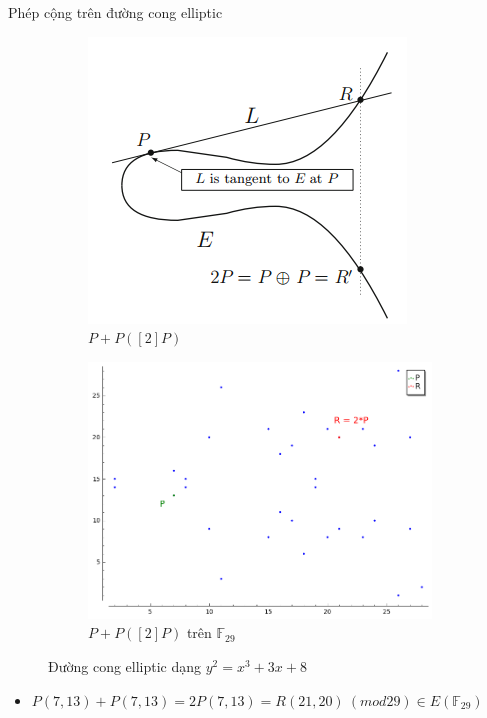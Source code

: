 \documentclass[compress]{beamer}
\begin{document}
\begin{frame}{Phép cộng trên đường cong elliptic}
\begin{figure}[h]
\begin{subfigure}{.5\textwidth}
  \centering
  \includegraphics[width=0.85\linewidth]{../im3.png}
  \caption{$P + P ([2]P)$}
  \label{fig:sfig1}
\end{subfigure}%
\begin{subfigure}{.5\textwidth}
  \centering
  \includegraphics[width=1\linewidth]{../im14.png}
  \caption{$P + P ([2]P)$ trên $\mathbb{F}_{29}$}
  \label{fig:sfig2}
\end{subfigure}
\caption*{Đường cong elliptic dạng $y^2 = x^3 + 3x + 8$}
\label{fig:fig}
\end{figure}
\begin{itemize}
\item \small{$P(7 ,13) + P(7, 13) = 2P(7, 13) = R(21, 20) \ (mod 29) \in E(\mathbb{F}_{29})$}
\end{itemize}
\end{frame}
\end{document}

